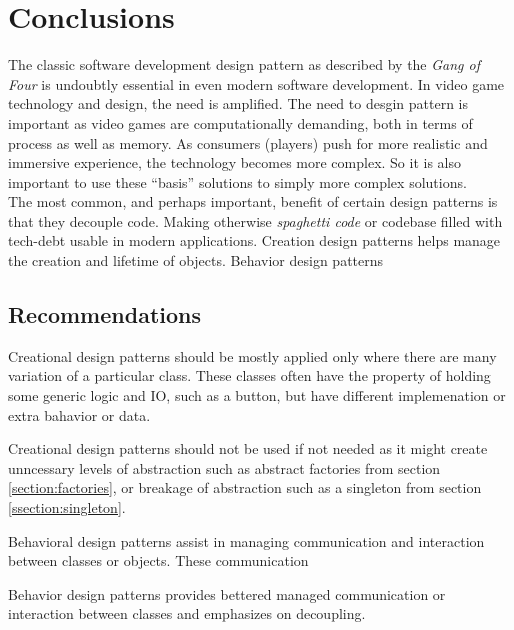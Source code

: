 \section{Conclusions}

The classic software development design pattern as described by the \textit{Gang of Four}\cite{gof} is undoubtly essential in even modern software development. In video game technology and design, the need is amplified. The need to desgin pattern is important as video games are computationally demanding, both in terms of process as well as memory. As consumers (players) push for more realistic and immersive experience, the technology becomes more complex. So it is also important to use these ``basis'' solutions to simply more complex solutions.\bs
\\
The most common, and perhaps important, benefit of certain design patterns is that they decouple code. Making otherwise \textit{spaghetti code} or codebase filled with tech-debt usable in modern applications. Creation design patterns helps manage the creation and lifetime of objects. Behavior design patterns 

\subsection{Recommendations}

Creational design patterns should be mostly applied only where there are many variation of a particular class. These classes often have the property of holding some generic logic and IO, such as a button, but have different implemenation or extra bahavior or data.

Creational design patterns should not be used if not needed as it might create unncessary levels of abstraction such as abstract factories from section \ref{section:factories}, or breakage of abstraction such as a singleton from section \ref{ssection:singleton}.

Behavioral design patterns assist in managing communication and interaction between classes or objects. These communication 

Behavior design patterns provides bettered managed communication or interaction between classes and emphasizes on decoupling.

